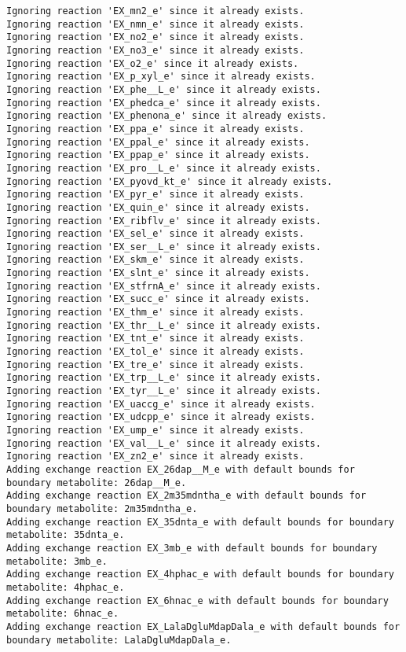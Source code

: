 \documentclass[
  letterpaper,
  DIV=11,
  numbers=noendperiod]{scrartcl}
\begin{document}
\begin{verbatim}
Ignoring reaction 'EX_mn2_e' since it already exists.
Ignoring reaction 'EX_nmn_e' since it already exists.
Ignoring reaction 'EX_no2_e' since it already exists.
Ignoring reaction 'EX_no3_e' since it already exists.
Ignoring reaction 'EX_o2_e' since it already exists.
Ignoring reaction 'EX_p_xyl_e' since it already exists.
Ignoring reaction 'EX_phe__L_e' since it already exists.
Ignoring reaction 'EX_phedca_e' since it already exists.
Ignoring reaction 'EX_phenona_e' since it already exists.
Ignoring reaction 'EX_ppa_e' since it already exists.
Ignoring reaction 'EX_ppal_e' since it already exists.
Ignoring reaction 'EX_ppap_e' since it already exists.
Ignoring reaction 'EX_pro__L_e' since it already exists.
Ignoring reaction 'EX_pyovd_kt_e' since it already exists.
Ignoring reaction 'EX_pyr_e' since it already exists.
Ignoring reaction 'EX_quin_e' since it already exists.
Ignoring reaction 'EX_ribflv_e' since it already exists.
Ignoring reaction 'EX_sel_e' since it already exists.
Ignoring reaction 'EX_ser__L_e' since it already exists.
Ignoring reaction 'EX_skm_e' since it already exists.
Ignoring reaction 'EX_slnt_e' since it already exists.
Ignoring reaction 'EX_stfrnA_e' since it already exists.
Ignoring reaction 'EX_succ_e' since it already exists.
Ignoring reaction 'EX_thm_e' since it already exists.
Ignoring reaction 'EX_thr__L_e' since it already exists.
Ignoring reaction 'EX_tnt_e' since it already exists.
Ignoring reaction 'EX_tol_e' since it already exists.
Ignoring reaction 'EX_tre_e' since it already exists.
Ignoring reaction 'EX_trp__L_e' since it already exists.
Ignoring reaction 'EX_tyr__L_e' since it already exists.
Ignoring reaction 'EX_uaccg_e' since it already exists.
Ignoring reaction 'EX_udcpp_e' since it already exists.
Ignoring reaction 'EX_ump_e' since it already exists.
Ignoring reaction 'EX_val__L_e' since it already exists.
Ignoring reaction 'EX_zn2_e' since it already exists.
Adding exchange reaction EX_26dap__M_e with default bounds for boundary metabolite: 26dap__M_e.
Adding exchange reaction EX_2m35mdntha_e with default bounds for boundary metabolite: 2m35mdntha_e.
Adding exchange reaction EX_35dnta_e with default bounds for boundary metabolite: 35dnta_e.
Adding exchange reaction EX_3mb_e with default bounds for boundary metabolite: 3mb_e.
Adding exchange reaction EX_4hphac_e with default bounds for boundary metabolite: 4hphac_e.
Adding exchange reaction EX_6hnac_e with default bounds for boundary metabolite: 6hnac_e.
Adding exchange reaction EX_LalaDgluMdapDala_e with default bounds for boundary metabolite: LalaDgluMdapDala_e.

\end{verbatim}
\end{document}
